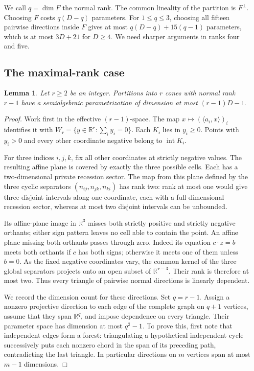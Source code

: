 \documentclass[a4paper,11pt,reqno]{amsart}
\newcommand{\R}{\mathbb R}
\newcommand{\intt}{\operatorname{int}}
\newtheorem{lemma}[theorem]{Lemma}
\theoremstyle{definition}
\theoremstyle{remark}
\numberwithin{equation}{section}
\begin{document}
We call $q=\dim F$ the normal rank. The common lineality of the
partition is $F^\perp$. Choosing $F$ costs $q(D-q)$ parameters.
For $1\le q\le3$, choosing all fifteen pairwise directions inside $F$ gives
at most $q(D-q)+15(q-1)$ parameters, which is at most $3D+21$ for
$D\ge4$. We need sharper arguments in ranks four and five.

\subsection{The maximal-rank case}
\begin{lemma}\label{lem:maxrank}
Let $r\ge2$ be an integer. Partitions into $r$ cones with normal rank $r-1$ have a semialgebraic
parametrization of dimension at most $(r-1)D-1$.
\end{lemma}
\begin{proof}
Work first in the effective $(r-1)$-space. The map
$x\mapsto(\langle a_i,x\rangle)_i$ identifies it with
$W_r=\{y\in\R^r:\sum_i y_i=0\}$. Each $K_i$ lies in $y_i\ge0$.
Points with $y_i>0$ and every other coordinate negative belong to
$\intt K_i$.

For three indices $i,j,k$, fix all other coordinates at strictly
negative values. The resulting affine plane is covered by exactly
the three possible cells. Each has a two-dimensional private recession
sector. The map from this plane defined by the three cyclic separators
$(n_{ij},n_{jk},n_{ki})$ has rank two: rank at most one would give
three disjoint intervals along one coordinate, each with a
full-dimensional recession sector, whereas at most two disjoint
intervals can be unbounded.

Its affine-plane image in $\R^3$ misses both strictly positive and
strictly negative orthants; either sign pattern leaves no cell able
to contain the point. An affine plane missing both orthants passes
through zero. Indeed its equation $c\cdot z=b$ meets both orthants
if $c$ has both signs; otherwise it meets one of them unless $b=0$.
As the fixed negative coordinates vary, the common kernel of the
three global separators projects onto an open subset of $\R^{r-3}$.
Their rank is therefore at most two. Thus every triangle of pairwise
normal directions is linearly dependent.

We record the dimension count for these directions. Set $q=r-1$.
Assign a nonzero projective direction to each edge of the complete
graph on $q+1$ vertices, assume that they span $\R^q$, and impose
dependence on every triangle. Their parameter space has dimension at
most $q^2-1$. To prove this, first note that independent edges form a
forest: triangulating a hypothetical independent cycle successively
puts each nonzero chord in the span of its preceding path, contradicting
the last triangle. In particular directions on $m$ vertices span at
most $m-1$ dimensions.


\end{proof}
\end{document}
